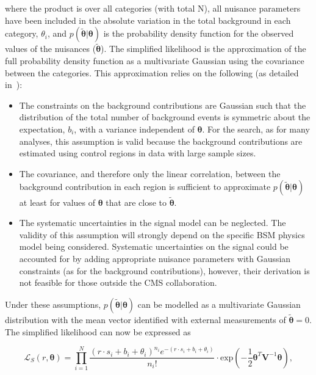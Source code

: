 where the product is over all categories (with total N), all nuisance parameters
have been included in the absolute variation in the total background in each category, $\theta_i$, and
$p(\tilde{\boldsymbol{\theta}}|\boldsymbol{\theta})$ is the probability density function for the observed values of the nuisances ($\tilde{\boldsymbol{\theta}}$). 
The simplified likelihood is the approximation of the full probability density function as a multivariate Gaussian using the covariance between the categories.
This approximation relies on the following (as detailed in~\cite{simp-lik}):
\begin{itemize}
\item{The constraints on the background contributions are Gaussian such that the distribution of 
the total number of background events is symmetric about the expectation, $b_{i}$, 
with a variance independent of $\boldsymbol{\theta}$. For the \alphat search, as for many analyses, 
this assumption is valid because the background contributions are estimated using control regions in 
data with large sample sizes.}

\item{The covariance, and therefore only the linear correlation, 
between the background contribution in each region is sufficient 
to approximate $p(\tilde{\boldsymbol{\theta}}|\boldsymbol{\theta})$ 
at least for values of $\boldsymbol{\theta}$ that are close to $\tilde{\boldsymbol{\theta}}$.}

\item{The systematic uncertainties in the signal model can be neglected. The validity of 
this assumption will strongly depend on the specific BSM physics model being considered. 
Systematic uncertainties on the signal could be accounted for by adding appropriate 
nuisance parameters with Gaussian constraints (as for the background contributions), however,
their derivation is not feasible for those outside the CMS collaboration.} 
\end{itemize}

Under these assumptions, $p(\tilde{\boldsymbol{\theta}}|\boldsymbol{\theta})$ can be modelled as a multivariate 
Gaussian distribution with the mean vector identified with external measurements of 
$\tilde{\boldsymbol{\theta}}=0$. The simplified likelihood can now be expressed as

\begin{equation}
\mathcal{L}_{S}(r, \boldsymbol{\theta}) =  \prod_{i=1}^{N} \dfrac{(r \cdot s_{i}+b_{i}+\theta_{i})^{n_{i}} e^{-(r \cdot s_{i}+b_{i}+\theta_{i})} }{n_{i}!} \cdot  
\mathrm{exp}\left(-\dfrac{1}{2} \boldsymbol{\theta}^{T}\mathrm{\mathbf{V}}^{-1}\boldsymbol{\theta} \right),
\label{eq:full-likelihood}
\end{equation}

